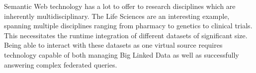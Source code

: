 Semantic Web technology has a lot to offer to research disciplines which are inherently multidisciplinary. The Life Sciences are an interesting example, spanning multiple disciplines ranging from pharmacy to genetics to clinical trials.
This necessitates the runtime integration of different datasets of significant size. 
Being able to interact with these datasets as one virtual source requires technology capable of both managing Big Linked Data as well as successfully answering complex federated queries.
\vfill %
